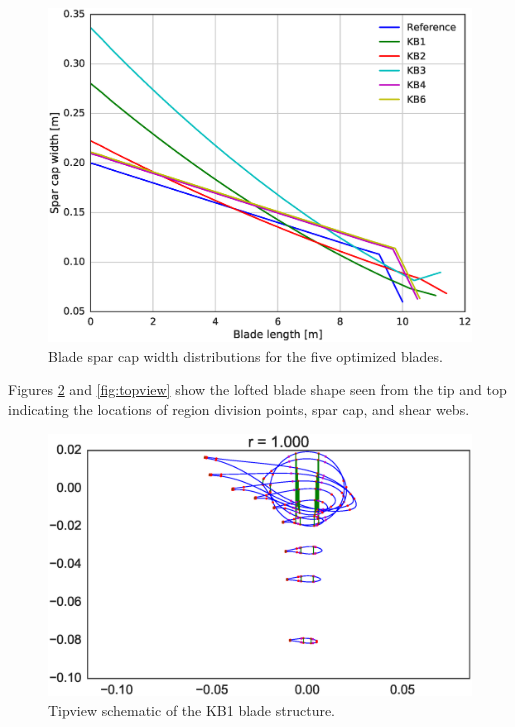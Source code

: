\begin{figure}[pht]
\begin{center}
	\includegraphics[width=.85\linewidth]{figures/KBcomp_spar_cap_width.eps}
\end{center}
\caption{Blade spar cap width distributions for the five optimized blades.}
\label{fig:capwidth}
\end{figure}

Figures \ref{fig:tipview} and \ref{fig:topview} show the lofted blade shape seen from the tip and top indicating the locations of region division points, spar cap, and shear webs.

\begin{figure}[pht]
\begin{center}
	\includegraphics[width=.85\linewidth]{figures/KB1_tipview.eps}
\end{center}
\caption{Tipview schematic of the KB1 blade structure.}
\label{fig:tipview}
\end{figure}

